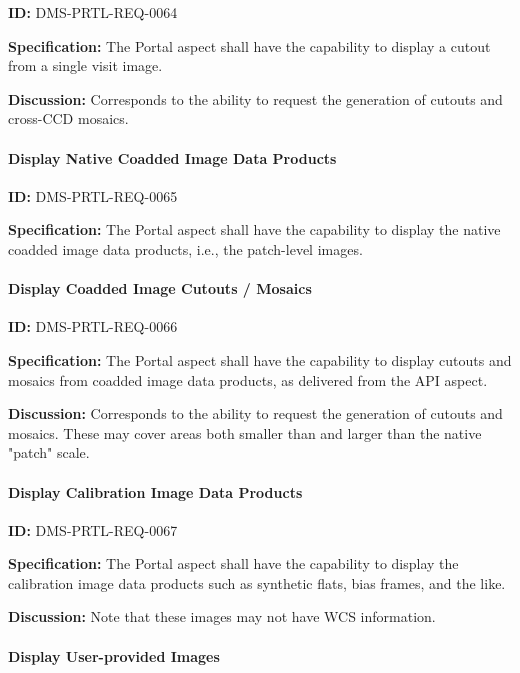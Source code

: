 \documentclass[SE,toc]{lsstdoc}
\begin{document}
\label{DMS-PRTL-REQ-0064}
\textbf{ID:} DMS-PRTL-REQ-0064

\textbf{Specification:}
The Portal aspect shall have the capability to display a cutout from a single visit image.

\textbf{Discussion:}
Corresponds to the ability to request the generation of cutouts and cross-CCD mosaics.

\paragraph{Display Native Coadded Image Data Products}\hfill  %

\label{DMS-PRTL-REQ-0065}
\textbf{ID:} DMS-PRTL-REQ-0065

\textbf{Specification:}
The Portal aspect shall have the capability to display the native coadded image data products, i.e., the patch-level images.

\paragraph{Display Coadded Image Cutouts / Mosaics}\hfill  %

\label{DMS-PRTL-REQ-0066}
\textbf{ID:} DMS-PRTL-REQ-0066

\textbf{Specification:}
The Portal aspect shall have the capability to display cutouts and mosaics from coadded image data products, as delivered from the API aspect.

\textbf{Discussion:}
Corresponds to the ability to request the generation of cutouts and mosaics.  These may cover areas both smaller than and larger than the native "patch" scale.

\paragraph{Display Calibration Image Data Products}\hfill  %

\label{DMS-PRTL-REQ-0067}
\textbf{ID:} DMS-PRTL-REQ-0067

\textbf{Specification:}
The Portal aspect shall have the capability to display the calibration image data products such as synthetic flats, bias frames, and the like.

\textbf{Discussion:}
Note that these images may not have WCS information.

\paragraph{Display User-provided Images}\hfill  %
\end{document}
